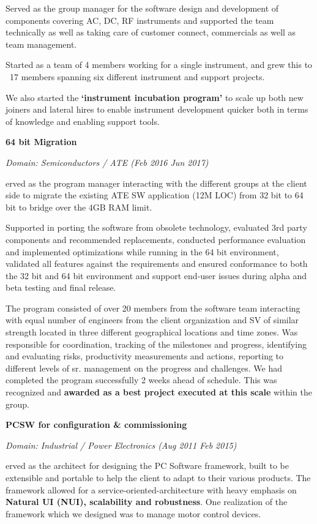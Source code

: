 \documentclass[a4paper,12pt]{article}
\newcommand\cvprojectentry[5]{
  \textbf{#1}
  
  \it{Domain: #2}\normalfont{} \quad (#3 \textendash #4)
  
}
\begin{document}
{Served as the group manager for the software design and development of
components covering AC, DC, RF instruments and supported the team
technically as well as taking care of customer connect, commercials as
well as team management.
  
Started as a team of 4 members working for a single instrument, and
grew this to ~17 members spanning six different instrument and support
projects.

We also started the \textbf{`instrument incubation program'} to scale
up both new joiners and lateral hires to enable instrument development
quicker both in terms of knowledge and enabling support tools.

}

\cvprojectentry{64 bit Migration}{Semiconductors / ATE}{Feb 2016}{Jun 2017}

Served as the program manager interacting with the different groups at
the client side to migrate the existing ATE SW application (12M LOC)
from 32 bit to 64 bit to bridge over the 4GB RAM limit.

Supported in porting the software from obsolete technology, evaluated
3rd party components and recommended replacements, conducted
performance evaluation and implemented optimizations while running in
the 64 bit environment, validated all features against the
requirements and ensured conformance to both the 32 bit and 64 bit
environment and support end-user issues during alpha and beta testing
and final release.
 
The program consisted of over 20 members from the software team
interacting with equal number of engineers from the client
organization and SV of similar strength located in three different
geographical locations and time zones. Was responsible for
coordination, tracking of the milestones and progress, identifying and
evaluating risks, productivity measurements and actions, reporting to
different levels of sr. management on the progress and challenges. We
had completed the program successfully 2 weeks ahead of schedule. This
was recognized and \textbf{awarded as a best project executed at this
scale} within the group.

\cvprojectentry{PCSW for configuration \& commissioning}{Industrial / Power Electronics}{Aug 2011}{Feb 2015}

Served as the architect for designing the PC Software framework, built
to be extensible and portable to help the client to adapt to their
various products. The framework allowed for a
service-oriented-architecture with heavy emphasis on \textbf{Natural
  UI (NUI), scalability and robustness}. One realization of the
framework which we designed was to manage motor control devices.
 
\end{document}
